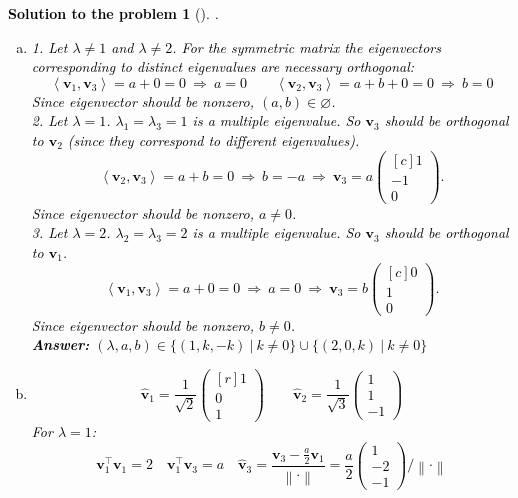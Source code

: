 \documentclass[12pt,a4]{article}
\newtheorem{solution}{Solution to the problem}
\newcommand{\sprod}[2]{\left \langle #1, #2 \right \rangle}
\newcommand{\norm}[1]{\left\lVert#1\right\rVert}
\newcommand{\bv}{{\mathbf v}}
\newcommand{\answer}[1]{\textbf{Answer:} #1}
\begin{document}
\textcolor{black}{
\begin{solution}[]\rm .
\begin{enumerate}[(a)]
	\item
1. Let $\lambda \neq 1$ and $\lambda \neq 2$. For the symmetric matrix the eigenvectors corresponding to distinct eigenvalues are necessary orthogonal:
\[
\sprod{\bv_1}{\bv_3} = a  + 0 = 0
~\Rightarrow~
a = 0
\qquad
\sprod{\bv_2}{\bv_3} = a + b + 0 = 0
~\Rightarrow~
b = 0
\]
Since eigenvector should be nonzero, $(a,b) \in \varnothing$.\\
2. Let $\lambda = 1 $.
$\lambda_1 = \lambda_3 = 1$ is a multiple eigenvalue. So $\bv_3$ should be orthogonal to $\bv_2$ (since they correspond to different eigenvalues).
\[
\sprod{\bv_2}{\bv_3} = a + b = 0
~\Rightarrow~
b = - a
~\Rightarrow~
\bv_3 = a \begin{pmatrix}[c] 1\\ -1 \\ 0 \end{pmatrix}.
\]
Since eigenvector should be nonzero, $a \neq 0$. \\
3. Let $\lambda = 2 $.
$\lambda_2 = \lambda_3 = 2$ is a multiple eigenvalue. So $\bv_3$ should be orthogonal to $\bv_1$.
\[
\sprod{\bv_1}{\bv_3} = a + 0 = 0
~\Rightarrow~
a = 0
~\Rightarrow~
\bv_3 = b \begin{pmatrix}[c] 0\\ 1 \\ 0 \end{pmatrix}.
\]
Since eigenvector should be nonzero, $b \neq 0$. \\
\answer{
$ (\lambda, a, b) \in \{(1,k,-k)~|~k \neq 0 \} \cup \{(2,0,k)~|~k \neq 0 \}
$
}
	\item
\[
\hat \bv_1 = \frac1{\sqrt2} \begin{pmatrix}[r] 1 \\ 0 \\ 1\end{pmatrix}
\qquad
\hat \bv_2 = \frac1{\sqrt3} \begin{pmatrix} 1 \\ 1 \\ -1 \end{pmatrix}
\]
For $\lambda = 1$:
\[
\bv_1^\top \bv_1 = 2
\quad
\bv_1^\top \bv_3 = a
\quad
\hat \bv_3 = \frac{\bv_3 - \frac{a}2 \bv_1}{\norm{\cdot}} = 
\frac{a}2 \begin{pmatrix} 1 \\ - 2 \\ -1 \end{pmatrix}
/\norm{\cdot}
\]
\end{enumerate}
\end{solution}}
\end{document}
